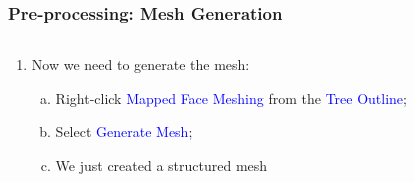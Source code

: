\documentclass[10pt,compress, unknownkeysallowed]{beamer}
\newcommand{\blue}{\textcolor{blue}}
\begin{document}
 
\begin{frame}
 \frametitle{Pre-processing: Mesh Generation} 
    \begin{columns}
       \begin{column}[l]{0.5\linewidth}
          \begin{enumerate}\scriptsize\setcounter{enumi}{5}
             \item<1-> Now we need to generate the mesh:
                \begin{enumerate}[a)]\scriptsize
                   \item<2-> Right-click \blue{Mapped Face Meshing} from the \blue{Tree Outline};
                   \item<2-> Select \blue{Generate Mesh};
                   \item<2-> We just created a structured mesh
                \end{enumerate}
          \end{enumerate}
       \end{column}
       \begin{column}[l]{0.5\linewidth}
       \end{column}
    \end{columns}
\end{frame} 
\end{document}
